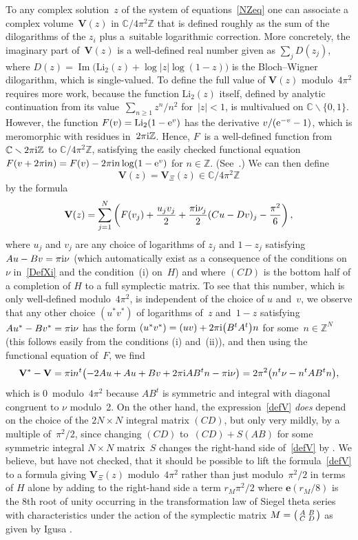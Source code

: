 \documentclass[pdftex]{sigma}
\numberwithin{equation}{section}
\def\e{\mathbf{e}}
\def\C{\mathbb C}
\def\Z{\mathbb Z}
\def\m{ - }
\def\e{\mathbf{e}}
\def\sma#1#2#3#4{\bigl(\smallmatrix#1&#2\\#3&#4\endsmallmatrix\bigr)} %
\def\V{\mathbf V}
\def\be{\begin{equation}}
\def\ee{\end{equation}}
\def\ssm{\smallsetminus}
\def\Li{\mathrm{Li}}
\begin{document}
To any complex solution~$z$ of the system of equations~\eqref{NZeq} one can
associate a complex volume~$\V(z)$ in $\C/4\pi^2\Z$ that is defined roughly as the
sum of the dilogarithms of the $z_i$ plus a~suitable logarithmic correction. More
concretely, the imaginary part of~$\V(z)$ is a well-defined real number given
as $\sum_j D(z_j)$, where $D(z)=\operatorname{Im}\bigl(\Li_2(z)+\log|z|\log(1-z)\bigr)$ is
the Bloch--Wigner dilogarithm, which is single-valued. To define the full
value of $\V(z)$ modulo~$4\pi^2$ requires more work, because the function
$\Li_2(z)$ itself, defined by analytic continuation from its value~$\sum_{n\ge1}z^n/n^2 $ for~${|z|<1}$, is multivalued on $\C\ssm\{0,1\}$.
However, the function ${F(v)=\Li_2(1-{\rm e}^v)}$ has the derivative $v/({\rm e}^{-v}-1)$,
which is meromorphic with residues in~$2\pi {\rm i}\Z$. Hence, $F$~is a
well-defined function from $\C\ssm2\pi {\rm i}\Z$ to $\C/4\pi^2\Z$, satisfying the
easily checked functional equation~${F(v+2\pi {\rm i}n)=F(v)-2\pi {\rm i}n\log(1-{\rm e}^v)}$ for $n\in\Z$.
(See~\cite{Zagier-Gangl}.) We can then define
\[
\V(z)=\V_\Xi(z)\in\C/4\pi^2\Z
\]
by the formula
\be
\label{defV}
\V(z) = \sum_{j=1}^N\left(F(v_j)+\frac{u_jv_j}2
+ \frac{\pi {\rm i}\nu_j}2 (Cu-Dv)_j \m \frac{\pi^2}6 \right) ,
\ee
where $u_j$ and $v_j$ are any choice of logarithms of $z_j$ and $1-z_j$ satisfying
$Au-Bv=\pi {\rm i}\nu$ (which automatically exist as a consequence of the conditions on~$\nu$
in~\eqref{DefXi} and the condition~(i) on~$H$) and where $(C D)$ is the bottom
half of a completion of $H$ to a full symplectic matrix. To see that this number,
which is only well-defined modulo~$4\pi^2$, is independent of the choice of $u$ and~$v$,
we observe that any other choice $(u^* v^*)$ of logarithms of~$z$ and~$1-z$ satisfying
$Au^*-Bv^*=\pi{\rm i}\nu$ has the form $(u^* v^*)=(u v)+2\pi {\rm i} \big(B^t A^t\big) n$ for
some~$n\in\Z^N$ (this follows easily from the conditions (i) and~(ii)), and then
using the functional equation of~$F$, we find
\[
\V^*\m\V=\pi {\rm i}n^t \bigl(-2Au+Au+Bv+2\pi {\rm i} AB^t n\m\pi {\rm i} \nu\bigr)
= 2\pi^2\big(n^t\nu\m n^tAB^tn\big) ,
\]
which is 0~modulo~$4\pi^2$ because
$AB^t$ is symmetric and integral with diagonal congruent to $\nu$ modulo~2. On
the other hand, the expression~\eqref{defV} \emph{does} depend on the choice of the
${2N\times N}$ integral matrix $(C D)$, but only very mildly, by a multiple of~$\pi^2/2$,
since changing $(C D)$ to~${(C D)+S(A B)}$ for some symmetric integral $N\times N$
matrix~$S$ changes the right-hand side of~\eqref{defV} by .
We believe, but have not checked, that it should be possible to lift the
formula~\eqref{defV} to a formula giving $\V_\Xi(z)$ modulo~$4\pi^2$ rather than
just modulo~$\pi^2/2$ in terms of $H$ alone by adding to the right-hand side a term
$r_M\pi^2/2$ where $\e(r_M/8)$ is the 8th root of unity occurring in the
transformation law of Siegel theta series with characteristics under the action of
the symplectic matrix $M=\sma ABCD$ as given by Igusa \cite[Theorem~3, p.~182]{Igusa}.
\end{document}
